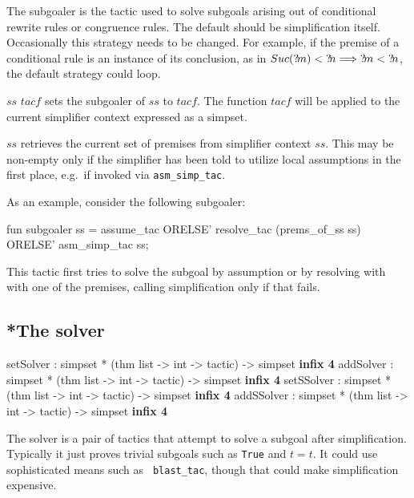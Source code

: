 The subgoaler is the tactic used to solve subgoals arising out of
conditional rewrite rules or congruence rules.  The default should be
simplification itself.  Occasionally this strategy needs to be
changed.  For example, if the premise of a conditional rule is an
instance of its conclusion, as in $Suc({?\!m}) < {?\!n} \Longrightarrow {?\!m}
< {?\!n}$, the default strategy could loop.

\begin{ttdescription}
  
\item[$ss$ \ttindexbold{setsubgoaler} $tacf$] sets the subgoaler of
  $ss$ to $tacf$.  The function $tacf$ will be applied to the current
  simplifier context expressed as a simpset.
  
\item[\ttindexbold{prems_of_ss} $ss$] retrieves the current set of
  premises from simplifier context $ss$.  This may be non-empty only
  if the simplifier has been told to utilize local assumptions in the
  first place, e.g.\ if invoked via \texttt{asm_simp_tac}.

\end{ttdescription}

As an example, consider the following subgoaler:
\begin{ttbox}
fun subgoaler ss =
    assume_tac ORELSE'
    resolve_tac (prems_of_ss ss) ORELSE'
    asm_simp_tac ss;
\end{ttbox}
This tactic first tries to solve the subgoal by assumption or by
resolving with with one of the premises, calling simplification only
if that fails.


\subsection{*The solver}\label{sec:simp-solver}
\begin{ttbox}
setSolver  : simpset * (thm list -> int -> tactic) -> simpset \hfill{\bf infix 4}
addSolver  : simpset * (thm list -> int -> tactic) -> simpset \hfill{\bf infix 4}
setSSolver : simpset * (thm list -> int -> tactic) -> simpset \hfill{\bf infix 4}
addSSolver : simpset * (thm list -> int -> tactic) -> simpset \hfill{\bf infix 4}
\end{ttbox}

The solver is a pair of tactics that attempt to solve a subgoal after
simplification.  Typically it just proves trivial subgoals such as
{\tt True} and $t=t$.  It could use sophisticated means such as {\tt
  blast_tac}, though that could make simplification expensive.

